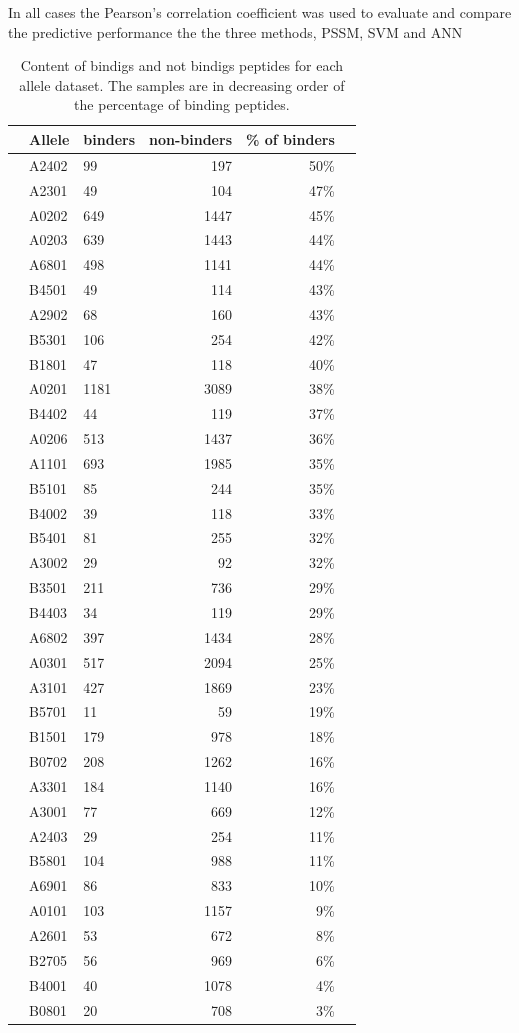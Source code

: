 
In all cases the Pearson's correlation coefficient was used to evaluate and compare the predictive performance the the three methods, PSSM, SVM and ANN

\begin{table}[ht]\scriptsize
\begin{center}
\begin{tabular}{rllrrr}
\hline
 & Allele	&	 binders & non-binders & \% of binders \\
\hline
 & A2402	&	99	&	197	&	50\%	\\
 & A2301	&	49	&	104	&	47\%	\\
 & A0202	&	649	&	1447	&	45\%	\\
 & A0203	&	639	&	1443	&	44\%	\\
 & A6801	&	498	&	1141	&	44\%	\\
 & B4501	&	49	&	114	&	43\%	\\
 & A2902	&	68	&	160	&	43\%	\\
 & B5301	&	106	&	254	&	42\%	\\
 & B1801	&	47	&	118	&	40\%	\\
 & A0201	&	1181	&	3089	&	38\%	\\
 & B4402	&	44	&	119	&	37\%	\\
 & A0206	&	513	&	1437	&	36\%	\\
 & A1101	&	693	&	1985	&	35\%	\\
 & B5101	&	85	&	244	&	35\%	\\
 & B4002	&	39	&	118	&	33\%	\\
 & B5401	&	81	&	255	&	32\%	\\
 & A3002	&	29	&	92	&	32\%	\\
 & B3501	&	211	&	736	&	29\%	\\
 & B4403	&	34	&	119	&	29\%	\\
 & A6802	&	397	&	1434	&	28\%	\\
 & A0301	&	517	&	2094	&	25\%	\\
 & A3101	&	427	&	1869	&	23\%	\\
 & B5701	&	11	&	59	&	19\%	\\
 & B1501	&	179	&	978	&	18\%	\\
 & B0702	&	208	&	1262	&	16\%	\\
 & A3301	&	184	&	1140	&	16\%	\\
 & A3001	&	77	&	669	&	12\%	\\
 & A2403	&	29	&	254	&	11\%	\\
 & B5801	&	104	&	988	&	11\%	\\
 & A6901	&	86	&	833	&	10\%	\\
 & A0101	&	103	&	1157	&	9\%	\\
 & A2601	&	53	&	672	&	8\%	\\
 & B2705	&	56	&	969	&	6\%	\\
 & B4001	&	40	&	1078	&	4\%	\\
 & B0801	&	20	&	708	&	3\%	\\
\hline
\end{tabular}
\caption{Content of bindigs and not bindigs peptides for each allele dataset. The samples are in decreasing order of the percentage of binding peptides.}\label{ftable}
\end{center}
\end{table}
